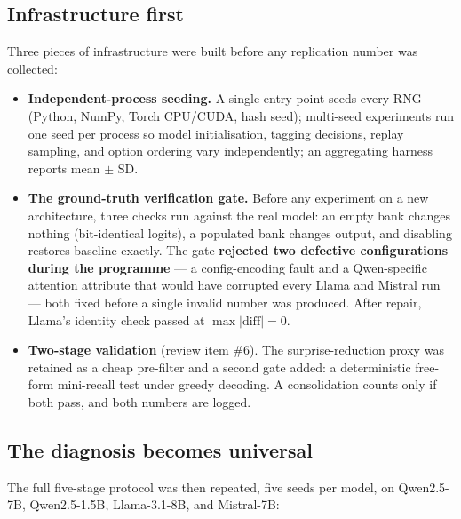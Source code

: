 \documentclass[11pt]{article}
\begin{document}
\subsection{Infrastructure first}

Three pieces of infrastructure were built before any replication number was collected:

\begin{itemize}
\item \textbf{Independent-process seeding.} A single entry point seeds every RNG (Python, NumPy,
      Torch CPU/CUDA, hash seed); multi-seed experiments run one seed per process so model
      initialisation, tagging decisions, replay sampling, and option ordering vary independently;
      an aggregating harness reports mean $\pm$ SD.
\item \textbf{The ground-truth verification gate.} Before any experiment on a new architecture,
      three checks run against the real model: an empty bank changes nothing (bit-identical
      logits), a populated bank changes output, and disabling restores baseline exactly. The gate
      \textbf{rejected two defective configurations during the programme} --- a config-encoding
      fault and a Qwen-specific attention attribute that would have corrupted every Llama and
      Mistral run --- both fixed before a single invalid number was produced. After repair,
      Llama's identity check passed at $\max|\mathrm{diff}| = 0$.
\item \textbf{Two-stage validation} (review item \#6). The surprise-reduction proxy was retained
      as a cheap pre-filter and a second gate added: a deterministic free-form mini-recall test
      under greedy decoding. A consolidation counts only if both pass, and both numbers are
      logged.
\end{itemize}

\subsection{The diagnosis becomes universal}

The full five-stage protocol was then repeated, five seeds per model, on Qwen2.5-7B, Qwen2.5-1.5B,
Llama-3.1-8B, and Mistral-7B:
\end{document}

